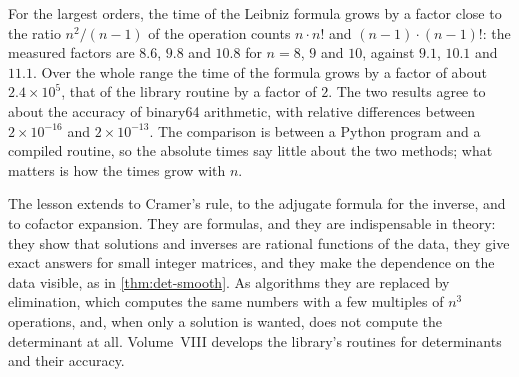For the largest orders, the time of the Leibniz formula grows by a factor close to the ratio $n^2/(n-1)$ of the operation counts $n\cdot n!$ and $(n-1)\cdot(n-1)!$: the measured factors are $8.6$, $9.8$ and $10.8$ for $n=8$, $9$ and $10$, against $9.1$, $10.1$ and $11.1$. Over the whole range the time of the formula grows by a factor of about $2.4\times10^5$, that of the library routine by a factor of $2$. The two results agree to about the accuracy of binary64 arithmetic, with relative differences between $2\times10^{-16}$ and $2\times10^{-13}$. The comparison is between a Python program and a compiled routine, so the absolute times say little about the two methods; what matters is how the times grow with $n$.

The lesson extends to Cramer's rule, to the adjugate formula for the inverse, and to cofactor expansion. They are formulas, and they are indispensable in theory: they show that solutions and inverses are rational functions of the data, they give exact answers for small integer matrices, and they make the dependence on the data visible, as in \cref{thm:det-smooth}. As algorithms they are replaced by elimination, which computes the same numbers with a few multiples of $n^3$ operations, and, when only a solution is wanted, does not compute the determinant at all. Volume~VIII develops the library's routines for determinants and their accuracy.

